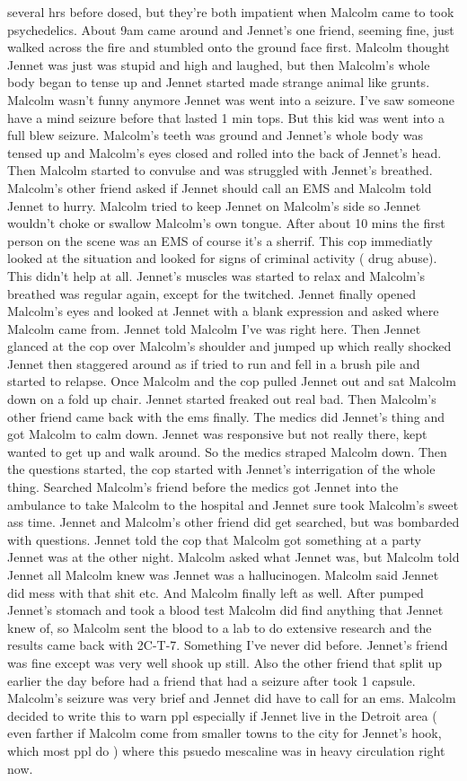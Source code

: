 \documentclass[12pt]{book}
\begin{document}
several hrs before dosed, but they're both impatient when Malcolm came to took psychedelics. About 9am came around and Jennet's one friend, seeming fine, just walked across the fire and stumbled onto the ground face first. Malcolm thought Jennet was just was stupid and high and laughed, but then Malcolm's whole body began to tense up and Jennet started made strange animal like grunts. Malcolm wasn't funny anymore Jennet was went into a seizure. I've saw someone have a mind seizure before that lasted 1 min tops. But this kid was went into a full blew seizure. Malcolm's teeth was ground and Jennet's whole body was tensed up and Malcolm's eyes closed and rolled into the back of Jennet's head. Then Malcolm started to convulse and was struggled with Jennet's breathed. Malcolm's other friend asked if Jennet should call an EMS and Malcolm told Jennet to hurry. Malcolm tried to keep Jennet on Malcolm's side so Jennet wouldn't choke or swallow Malcolm's own tongue. After about 10 mins the first person on the scene was an EMS of course it's a sherrif. This cop immediatly looked at the situation and looked for signs of criminal activity ( drug abuse). This didn't help at all. Jennet's muscles was started to relax and Malcolm's breathed was regular again, except for the twitched. Jennet finally opened Malcolm's eyes and looked at Jennet with a blank expression and asked where Malcolm came from. Jennet told Malcolm I've was right here. Then Jennet glanced at the cop over Malcolm's shoulder and jumped up which really shocked Jennet then staggered around as if tried to run and fell in a brush pile and started to relapse. Once Malcolm and the cop pulled Jennet out and sat Malcolm down on a fold up chair. Jennet started freaked out real bad. Then Malcolm's other friend came back with the ems finally. The medics did Jennet's thing and got Malcolm to calm down. Jennet was responsive but not really there, kept wanted to get up and walk around. So the medics straped Malcolm down. Then the questions started, the cop started with Jennet's interrigation of the whole thing. Searched Malcolm's friend before the medics got Jennet into the ambulance to take Malcolm to the hospital and Jennet sure took Malcolm's sweet ass time. Jennet and Malcolm's other friend did get searched, but was bombarded with questions. Jennet told the cop that Malcolm got something at a party Jennet was at the other night. Malcolm asked what Jennet was, but Malcolm told Jennet all Malcolm knew was Jennet was a hallucinogen. Malcolm said Jennet did mess with that shit etc. And Malcolm finally left as well. After pumped Jennet's stomach and took a blood test Malcolm did find anything that Jennet knew of, so Malcolm sent the blood to a lab to do extensive research and the results came back with 2C-T-7. Something I've never did before. Jennet's friend was fine except was very well shook up still. Also the other friend that split up earlier the day before had a friend that had a seizure after took 1 capsule. Malcolm's seizure was very brief and Jennet did have to call for an ems. Malcolm decided to write this to warn ppl especially if Jennet live in the Detroit area ( even farther if Malcolm come from smaller towns to the city for Jennet's hook, which most ppl do ) where this psuedo mescaline was in heavy circulation right now. 
\end{document}
